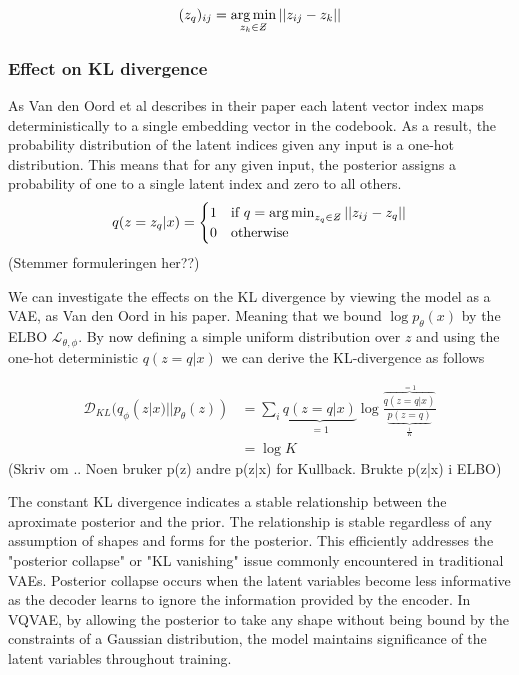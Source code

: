 $$(z_q)_{ij} = \argmin_{z_k \in \Zstroke}|| z_{ij} - z_k ||$$

\subsubsection{Effect on KL divergence}
As Van den Oord et al describes in their paper \cite{neuvqvae} each latent vector index maps deterministically to a single embedding vector in the codebook. As a result, the probability distribution of the latent indices given any input is a one-hot distribution. 
This means that for any given input, the posterior assigns a probability of one to a single latent index and zero to all others. 
\begin{equation}
    q(z = z_q | x) =
    \begin{cases}
    1 & \text{if } q = \argmin_{z_q \in \Zstroke} || z_{ij} - z_q || \\
    0 & \text{otherwise}
    \end{cases}
\end{equation}
(Stemmer formuleringen her??)

We can investigate the effects on the KL divergence by viewing the model as a VAE, as Van den Oord in his paper. Meaning that we bound $\log p_\theta(x)$ by the ELBO $\mathcal{L}_{\theta, \phi}$.
By now defining a simple uniform distribution over $z$ and using the one-hot deterministic $q(z=q|x)$ we can derive the KL-divergence as follows

\begin{equation}
    \begin{aligned}
        \mathcal{D}_{KL}(q_\phi(z|x) || p_\theta(z)) &= \sum_i \underbrace{q(z=q|x)}_{=1} \log \frac{\overbrace{q(z=q|x)}^{=1}}{\underbrace{p(z=q)}_{\frac{1}{K}}} \\
        &= \log K
    \end{aligned}
\end{equation}
(Skriv om .. Noen bruker p(z) andre p(z|x) for Kullback. Brukte p(z|x) i ELBO)

The constant KL divergence indicates a stable relationship between the aproximate posterior and the prior. The relationship is stable regardless of any assumption of shapes and forms for the posterior. This efficiently
addresses the "posterior collapse" or "KL vanishing"\cite{posteriorcollapse} issue commonly encountered in traditional VAEs. Posterior collapse occurs when the latent variables become less informative as the decoder learns to ignore the information provided by the 
encoder. In VQVAE, by allowing the posterior to take any shape without being bound by the constraints of a Gaussian distribution, the model maintains significance of the latent variables throughout training. 

